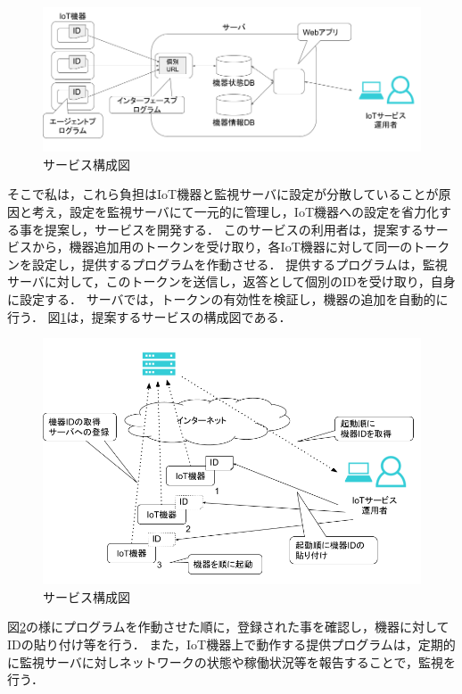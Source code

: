 \begin{figure}[htbp]
\includegraphics[width=16cm]{images/prop_diag.png}
\caption{サービス構成図}
\label{fig:prop_diag}
\end{figure}
そこで私は，これら負担はIoT機器と監視サーバに設定が分散していることが原因と考え，設定を監視サーバにて一元的に管理し，IoT機器への設定を省力化する事を提案し，サービスを開発する．
このサービスの利用者は，提案するサービスから，機器追加用のトークンを受け取り，各IoT機器に対して同一のトークンを設定し，提供するプログラムを作動させる．
提供するプログラムは，監視サーバに対して，このトークンを送信し，返答として個別のIDを受け取り，自身に設定する．
サーバでは，トークンの有効性を検証し，機器の追加を自動的に行う．
図\ref{fig:prop_diag}は，提案するサービスの構成図である．
\newpage

\begin{figure}[htbp]
\includegraphics[width=16cm]{images/prop_diag2.png}
\caption{サービス構成図}
\label{fig:prop_diag2}
\end{figure}
図\ref{fig:prop_diag2}の様にプログラムを作動させた順に，登録された事を確認し，機器に対してIDの貼り付け等を行う．
また，IoT機器上で動作する提供プログラムは，定期的に監視サーバに対しネットワークの状態や稼働状況等を報告することで，監視を行う．

